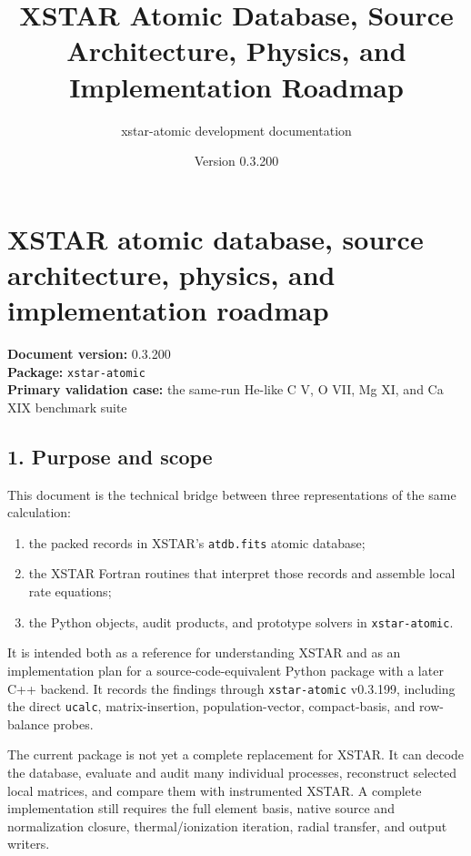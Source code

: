 \documentclass[
  10pt,
]{article}
\title{XSTAR Atomic Database, Source Architecture, Physics, and
Implementation Roadmap}
\author{xstar-atomic development documentation}
\date{Version 0.3.200}
\newcommand{\passthrough}[1]{#1}
\providecommand{\tightlist}{%
  \setlength{\itemsep}{0pt}\setlength{\parskip}{0pt}}
\begin{document}
\maketitle

{
\setcounter{tocdepth}{3}
\tableofcontents
}
\section{XSTAR atomic database, source architecture, physics, and
implementation
roadmap}\label{xstar-atomic-database-source-architecture-physics-and-implementation-roadmap}

\textbf{Document version:} 0.3.200\\
\textbf{Package:} \passthrough{\lstinline!xstar-atomic!}\\
\textbf{Primary validation case:} the same-run He-like C V, O VII, Mg
XI, and Ca XIX benchmark suite

\subsection{1. Purpose and scope}\label{purpose-and-scope}

This document is the technical bridge between three representations of
the same calculation:

\begin{enumerate}
\def\labelenumi{\arabic{enumi}.}
\tightlist
\item
  the packed records in XSTAR's \passthrough{\lstinline!atdb.fits!}
  atomic database;
\item
  the XSTAR Fortran routines that interpret those records and assemble
  local rate equations;
\item
  the Python objects, audit products, and prototype solvers in
  \passthrough{\lstinline!xstar-atomic!}.
\end{enumerate}

It is intended both as a reference for understanding XSTAR and as an
implementation plan for a source-code-equivalent Python package with a
later C++ backend. It records the findings through
\passthrough{\lstinline!xstar-atomic!} v0.3.199, including the direct
\passthrough{\lstinline!ucalc!}, matrix-insertion, population-vector,
compact-basis, and row-balance probes.

The current package is not yet a complete replacement for XSTAR. It can
decode the database, evaluate and audit many individual processes,
reconstruct selected local matrices, and compare them with instrumented
XSTAR. A complete implementation still requires the full element basis,
native source and normalization closure, thermal/ionization iteration,
radial transfer, and output writers.
\end{document}
